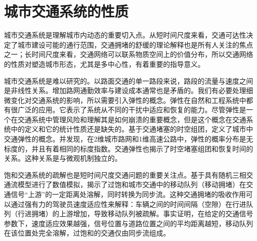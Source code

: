 \section{城市交通系统的性质}

城市交通系统是理解城市内动态的重要切入点。从短时间尺度来看，交通可达性决定了城市建设可能的通行范围，交通拥堵的舒缓的理论解释也是所有人关注的焦点之一；长时间尺度来看，交通网络可以联系物质空间上的价值分布，所以交通网络的性质对塑造城市形态，尤其是多中心性，有着重要的指导意义。

城市交通系统是难以研究的。以路面交通的单一路段来说，路段的流量与速度之间是非线性关系。增加路网通勤效率与建设成本通常也是矛盾的\cite{GulyNavigable}。我们有必要处理细微变化对交通系统的影响，所以需要引入弹性的概念。弹性在自然和工程系统中都有很广泛的应用。它表示了系统从不同的干扰中适应和恢复的能力。尽管弹性是一个在交通系统中管理风险和理解其是如何崩溃的重要概念，但是这个概念在交通系统中的定义和它的统计性质还是缺失的。\cite{Zhang8673}基于交通堵塞的时空组团，定义了城市中交通弹性的概念。并发现，在2维城市路网和1维高速公路中，弹性的概率分布是无标度的，并且有着相同的标度指数。交通弹性也揭示了时空堵塞组团和恢复时间的关系。这种关系是与微观机制独立的。

饱和交通系统的疏解也是短时间尺度交通问题的重要关注点。\cite{PhysRevE.88.054801}基于具有随机三相交通流模型进行了数值模拟，揭示了过饱和城市交通中的移动队列（移动拥堵）在交通信号“上游”的一定距离处溶解，同时转换为同步流。这种交通拥堵的吸收作用可以通过强有力的驾驶员速度适应性来解释：车辆之间的时间间隔（空隙）在行进队列（行进拥堵）的上游增加，导致移动队列被疏解。事实证明，在给定的交通信号参数下，速度适应效果越强，信号位置与道路位置之间的平均距离越短，移动队列在该位置处完全溶解，过饱和的交通仅由同步流组成。

